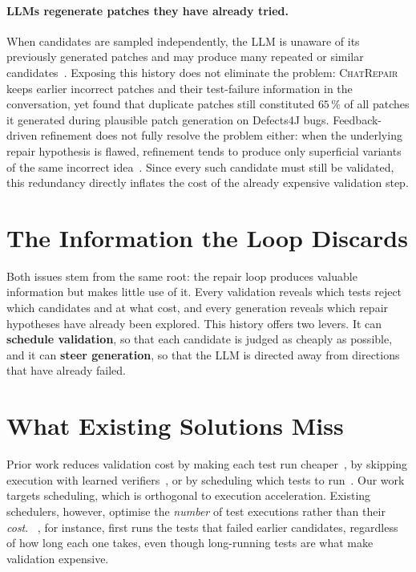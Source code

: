 \paragraph{LLMs regenerate patches they have already tried.}
When candidates are sampled independently, the LLM is unaware of its previously
generated patches and may produce many repeated or similar
candidates~\citep{xia2024chatrepair}. Exposing this history does not eliminate
the problem: \textsc{ChatRepair}~\citep{xia2024chatrepair} keeps earlier
incorrect patches and their test-failure information in the conversation, yet
\citet{chen2025conversational} found that duplicate patches still constituted
$65\,\%$ of all patches it generated during plausible patch generation on
Defects4J bugs. Feedback-driven refinement does not fully resolve the problem
either: when the underlying repair hypothesis is flawed, refinement tends to
produce only superficial variants of the same incorrect
idea~\citep{le2026semantic}. Since every such candidate must still be validated,
this redundancy directly inflates the cost of the already expensive validation
step.

\section{The Information the Loop Discards}
\label{sec:intro-root}

Both issues stem from the same root: the repair loop produces valuable
information but makes little use of it. Every validation reveals which tests
reject which candidates and at what cost, and every generation reveals which
repair hypotheses have already been explored. This history offers two levers. It
can \textbf{schedule validation}, so that each candidate is judged as cheaply as
possible, and it can \textbf{steer generation}, so that the LLM is directed away
from directions that have already failed.

\section{What Existing Solutions Miss}
\label{sec:intro-gap}

Prior work reduces validation cost by making each test run
cheaper~\citep{chen2021uniapr,xiao2024expressapr}, by skipping execution with
learned verifiers~\citep{jain2025r2egym}, or by scheduling which tests to
run~\citep{qi2013frtp,xia2025agentless}. Our work targets scheduling, which is
orthogonal to execution acceleration. Existing schedulers, however, optimise the
\emph{number} of test executions rather than their \emph{cost}.
\frtp~\citep{qi2013frtp}, for instance, first runs the tests that failed earlier
candidates, regardless of how long each one takes, even though long-running
tests are what make validation expensive.

